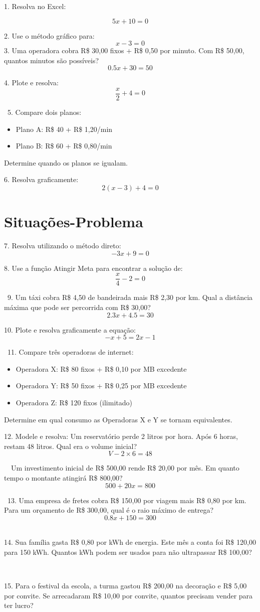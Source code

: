 \documentclass[11pt]{article}
\begin{document}
\begin{multicols}{2}
\par
1. Resolva no Excel:

\[ 5x + 10 = 0 \]

2. Use o método gráfico para:
\[ x - 3 = 0 \]
3. Uma operadora cobra R\$ 30,00 fixos + R\$ 0,50 por minuto. Com R\$ 50,00, quantos minutos são possíveis?
\[ 0.5x + 30 = 50 \]

4. Plote e resolva:
\[ \frac{x}{2} + 4 = 0 \]

\
5. Compare dois planos:
\begin{itemize}
    \item Plano A: R\$ 40 + R\$ 1,20/min
    \item Plano B: R\$ 60 + R\$ 0,80/min
\end{itemize}
Determine quando os planos se igualam.

6. Resolva graficamente:
\[ 2(x - 3) + 4 = 0 \]

\section*{Situações-Problema}

7. Resolva utilizando o método direto:
\[ -3x + 9 = 0 \]

8. Use a função Atingir Meta para encontrar a solução de:
\[ \frac{x}{4} - 2 = 0 \]

\
9. Um táxi cobra R\$ 4,50 de bandeirada mais R\$ 2,30 por km. Qual a distância máxima que pode ser percorrida com R\$ 30,00?
\[ 2.3x + 4.5 = 30 \]

10. Plote e resolva graficamente a equação:
\[ -x + 5 = 2x - 1 \]

\
11. Compare três operadoras de internet:
\begin{itemize}
    \item Operadora X: R\$ 80 fixos + R\$ 0,10 por MB excedente
    \item Operadora Y: R\$ 50 fixos + R\$ 0,25 por MB excedente
    \item Operadora Z: R\$ 120 fixos (ilimitado)
\end{itemize}
Determine em qual consumo as Operadoras X e Y se tornam equivalentes.

12. Modele e resolva:
Um reservatório perde 2 litros por hora. Após 6 horas, restam 48 litros. Qual era o volume inicial?
\[ V - 2 \times 6 = 48 \]

\
\
Um investimento inicial de R\$ 500,00 rende R\$ 20,00 por mês. Em quanto tempo o montante atingirá R\$ 800,00?
\[ 500 + 20x = 800 \]

\
13. Uma empresa de fretes cobra R\$ 150,00 por viagem mais R\$ 0,80 por km. Para um orçamento de R\$ 300,00, qual é o raio máximo de entrega?
\[ 0.8x + 150 = 300 \]
\

14. Sua família gasta R\$ 0,80 por kWh de energia. Este mês a conta foi R\$ 120,00 para 150 kWh. Quantos kWh podem ser usados para não ultrapassar R\$ 100,00?

\

15. Para o festival da escola, a turma gastou R\$ 200,00 na decoração e R\$ 5,00 por convite. Se arrecadaram R\$ 10,00 por convite, quantos precisam vender para ter lucro?

\

\end{multicols}
\end{document}
